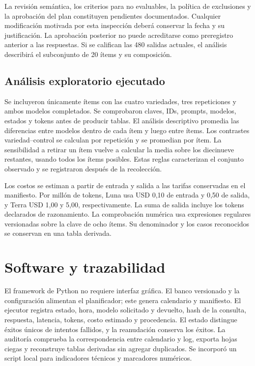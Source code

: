 \documentclass[conference]{IEEEtran}
\begin{document}
La revisión semántica, los criterios para no evaluables, la política de exclusiones y la aprobación del plan constituyen pendientes documentados. Cualquier modificación motivada por esta inspección deberá conservar la fecha y su justificación. La aprobación posterior no puede acreditarse como preregistro anterior a las respuestas. Si se califican las 480 salidas actuales, el análisis describirá el subconjunto de 20 ítems y su composición.

\subsection{Análisis exploratorio ejecutado}
Se incluyeron únicamente ítems con las cuatro variedades, tres repeticiones y ambos modelos completados. Se comprobaron claves, IDs, prompts, modelos, estados y tokens antes de producir tablas. El análisis descriptivo promedia las diferencias entre modelos dentro de cada ítem y luego entre ítems. Los contrastes variedad--control se calculan por repetición y se promedian por ítem. La sensibilidad a retirar un ítem vuelve a calcular la media sobre los diecinueve restantes, usando todos los ítems posibles. Estas reglas caracterizan el conjunto observado y se registraron después de la recolección.

Los costos se estiman a partir de entrada y salida a las tarifas conservadas en el manifiesto. Por millón de tokens, Luna usa USD 0,10 de entrada y 0,50 de salida, y Terra USD 1,00 y 5,00, respectivamente. La suma de salida incluye los tokens declarados de razonamiento. La comprobación numérica usa expresiones regulares versionadas sobre la clave de ocho ítems. Su denominador y los casos reconocidos se conservan en una tabla derivada.

\section{Software y trazabilidad}
El framework de Python no requiere interfaz gráfica. El banco versionado y la configuración alimentan el planificador; este genera calendario y manifiesto. El ejecutor registra estado, hora, modelo solicitado y devuelto, hash de la consulta, respuesta, latencia, tokens, costo estimado y procedencia. El estado distingue éxitos únicos de intentos fallidos, y la reanudación conserva los éxitos. La auditoría comprueba la correspondencia entre calendario y log, exporta hojas ciegas y reconstruye tablas derivadas sin agregar duplicados. Se incorporó un script local para indicadores técnicos y marcadores numéricos.
\end{document}
